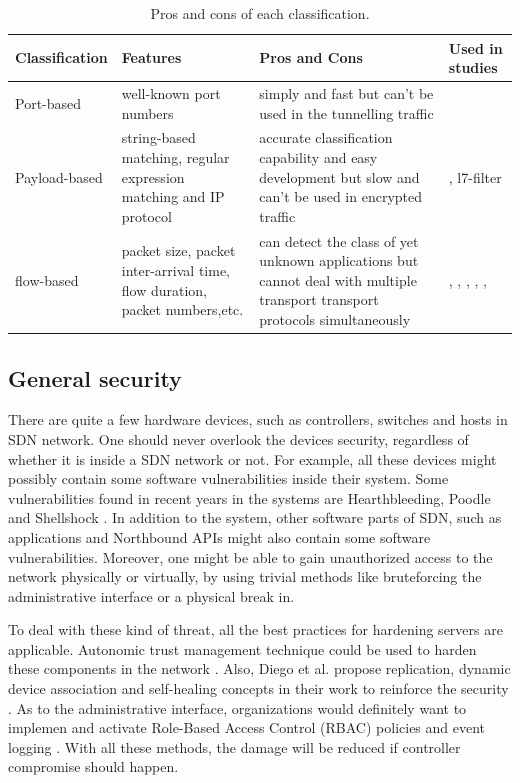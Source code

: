\begin{table}[H]
\centering
\caption{Pros and cons of each classification.}
\begin{tabular}{|l|p{3.5cm}|p{3.5cm}|p{3.5cm}|}
\hline Classification & Features & Pros and Cons & Used in studies \\
\hline
\hline Port-based & well-known port numbers & simply and fast but can't be used in the tunnelling traffic & \cite{TTC}\\
\hline Payload-based &  string-based matching, regular expression matching and IP protocol & accurate classification capability and easy development but slow and can't be used in encrypted traffic & \cite{nDPI} , {l7-filter} \\
\hline flow-based & packet size, packet inter-arrival time, flow duration, packet numbers,etc. & can detect the class of yet unknown applications but cannot deal with multiple transport transport protocols simultaneously & \cite{EAI06}, \cite{ATC13}, \cite{AIS14}, \cite{CMF04}, \cite{COC12}, \cite{FPN13, RTC10, AIS14, ASA09, FTC09} \\
\hline 
\end{tabular}
\label{table:pros-cons}
\end{table}

\subsection{General security}
There are quite a few hardware devices, such as controllers, switches and hosts in SDN network. One should never overlook the devices security, regardless of whether it is inside a SDN network or not. For example, all these devices might possibly contain some software vulnerabilities inside their system. Some vulnerabilities found in recent years in the systems are Hearthbleeding, Poodle and Shellshock \cite{HB,POODLE,SHELLSHOCK}. In addition to the system, other software parts of SDN, such as applications and Northbound APIs might also contain some software vulnerabilities. Moreover, one might be able to gain unauthorized access to the network physically or virtually, by using trivial methods like bruteforcing the administrative interface or a physical break in. 

To deal with these kind of threat, all the best practices for hardening servers are applicable. Autonomic trust management technique could be used to harden these components in the network \cite{YZP11}. Also, Diego et al. propose replication, dynamic device association and self-healing concepts in their work to reinforce the security \cite{KDFRV13}. As to the administrative interface, organizations would definitely want to implemen and activate Role-Based Access Control (RBAC) policies and event logging \cite{FFR09}. With all these methods, the damage will be reduced if controller compromise should happen.


